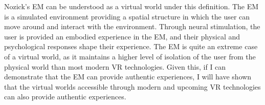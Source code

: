 Nozick's EM can be understood as a virtual world under this definition. The EM
is a simulated environment providing a spatial structure in which the user can
move around and interact with the environment. Through neural stimulation, the
user is provided an embodied experience in the EM, and their physical and
psychological responses shape their experience. The EM is quite an extreme case
of a virtual world, as it maintains a higher level of isolation of the user from
the physical world than most modern VR technologies. Given this, if I can
demonstrate that the EM can provide authentic experiences, I will have shown
that the virtual worlds accessible through modern and upcoming VR technologies
can also provide authentic experiences.
